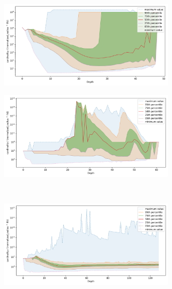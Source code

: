 \begin{figure}[ht!]
    \begin{subfigure}[b]{0.47\textwidth}
    \includegraphics[width=0.95\textwidth]{images/fractal_density/sift-1000000.png}\\
    \label{fig:results:sift-fractal_density}
    \end{subfigure}%
    \begin{subfigure}[b]{0.47\textwidth}
    \includegraphics[width=0.95\textwidth]{images/fractal_density/radio-ml-97920.png}\\
    \label{fig:results:radioml-fractal_density}
    \end{subfigure}%
    \\
    \begin{subfigure}[b]{0.47\textwidth}
    \includegraphics[width=0.95\textwidth]{images/fractal_density/silva-2224640.png}\\

\end{subfigure}
\end{figure}

